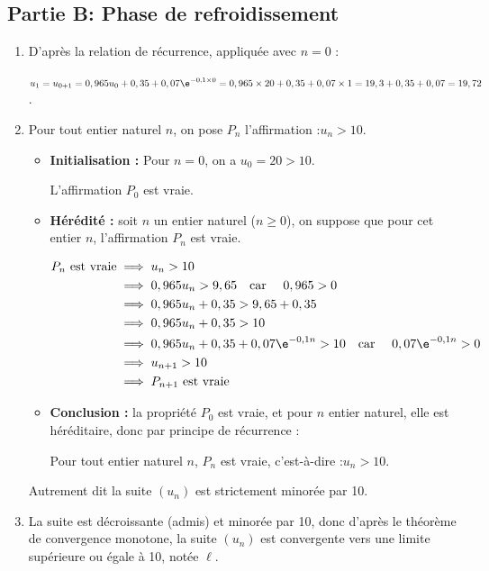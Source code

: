 	\subsection*{Partie B: Phase de refroidissement}
		\begin{enumerate}
			\item D'après la relation de récurrence, appliquée avec $n = 0$ :

			$u_{1}=u_{0 + 1} = 0,965u_0 + 0,35 + 0,07\e^{-0,1\times 0} = 0,965 \times 20 + 0,35 + 0,07\times 1 = 19,3 + 0,35 + 0,07 = 19,72$.

			\item Pour tout entier naturel $n$, on pose $P_n$ l'affirmation :\quad \og $u_{n}>10$\fg{}.

			\begin{itemize}[label=\textbullet~]
				\item \textbf{Initialisation :} Pour $n= 0$, on a $u_0 = 20 > 10$.

				L'affirmation $P_0$ est vraie.

				\item \textbf{Hérédité :} soit $n$ un entier naturel ($n \geqslant 0$), on suppose que pour cet entier $n$, l'affirmation $P_n$ est vraie.

				$\begin{aligned}
					P_n \text{ est vraie}
						&\implies u_n > 10\\
						&\implies 0,965 u_n > 9,65 \quad \text{car } \quad 0,965 > 0\\
						&\implies 0,965 u_n + 0,35 > 9,65 + 0,35\\
						&\implies 0,965 u_n + 0,35 > 10\\
						&\implies 0,965 u_n + 0,35 + 0,07\e^{-0,1n}> 10\quad \text{car } \quad 0,07\e^{-0,1n} > 0\\
						&\implies u_{n+1} > 10\\
						&\implies P_{n+1} \text{ est vraie}
				\end{aligned}$
				\item \textbf{Conclusion :} la propriété $P_0$ est vraie, et pour $n$ entier naturel, elle est héréditaire, donc par principe de récurrence :

				Pour tout entier naturel $n$, $P_n$ est vraie, c'est-à-dire :\quad $u_n > 10$.
			\end{itemize}

			Autrement dit la suite $(u_n)$ est strictement minorée par 10.

			\item La suite est décroissante (admis) et minorée par 10, donc d'après le théorème de convergence monotone, la suite $(u_{n})$ est convergente vers une limite supérieure ou égale à 10, notée $\ell$.


\end{enumerate}
